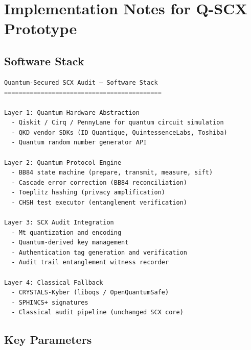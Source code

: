 \documentclass[11pt,a4paper]{article}
\theoremstyle{plain}
\theoremstyle{definition}
\theoremstyle{remark}
\begin{document}
\section{Implementation Notes for Q-SCX Prototype}
\label{app:implementation}

\subsection{Software Stack}

\begin{verbatim}
Quantum-Secured SCX Audit — Software Stack
===========================================

Layer 1: Quantum Hardware Abstraction
  - Qiskit / Cirq / PennyLane for quantum circuit simulation
  - QKD vendor SDKs (ID Quantique, QuintessenceLabs, Toshiba)
  - Quantum random number generator API

Layer 2: Quantum Protocol Engine
  - BB84 state machine (prepare, transmit, measure, sift)
  - Cascade error correction (BB84 reconciliation)
  - Toeplitz hashing (privacy amplification)
  - CHSH test executor (entanglement verification)

Layer 3: SCX Audit Integration
  - Mt quantization and encoding
  - Quantum-derived key management
  - Authentication tag generation and verification
  - Audit trail entanglement witness recorder

Layer 4: Classical Fallback
  - CRYSTALS-Kyber (liboqs / OpenQuantumSafe)
  - SPHINCS+ signatures
  - Classical audit pipeline (unchanged SCX core)
\end{verbatim}

\subsection{Key Parameters}
\end{document}

